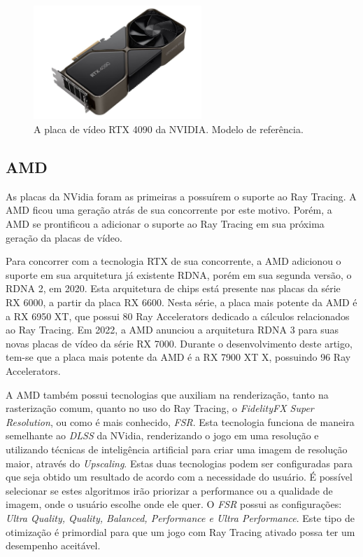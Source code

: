 \documentclass[journal]{IEEEtran}
\begin{document}
\begin{figure}[ht]
  \centering
  \includegraphics[width=2.5in]{media/rtx4090.jpg}
  \caption{A placa de vídeo RTX 4090 da NVIDIA. Modelo de referência.}
  \label{img_rtx4090}
\end{figure}


\subsection{AMD}
As placas da NVidia foram as primeiras a possuírem o suporte ao Ray Tracing. A AMD
ficou uma geração atrás de sua concorrente por este motivo. Porém, a AMD se prontificou
a adicionar o suporte ao Ray Tracing em sua próxima geração da placas de vídeo.

Para concorrer com a tecnologia RTX de sua concorrente, a AMD adicionou o suporte em sua
arquitetura já existente RDNA, porém em sua segunda versão, o RDNA 2, em 2020. Esta arquitetura 
de chips está presente nas placas da série RX 6000, a partir da placa RX 6600. Nesta série,
a placa mais potente da AMD é a RX 6950 XT, que possui 80 Ray Accelerators dedicado a
cálculos relacionados ao Ray Tracing. Em 2022, a AMD anunciou a arquitetura RDNA 3 para
suas novas placas de vídeo da série RX 7000. Durante o desenvolvimento deste artigo,
tem-se que a placa mais potente da AMD é a RX 7900 XT X, possuindo 96 Ray Accelerators.

A AMD também possui tecnologias que auxiliam na renderização, tanto na rasterização comum,
quanto no uso do Ray Tracing, o \emph{FidelityFX Super Resolution}, ou como é mais conhecido,
\emph{FSR}. Esta tecnologia funciona de maneira semelhante ao \emph{DLSS} da NVidia, renderizando
o jogo em uma resolução e utilizando técnicas de inteligência artificial para criar uma imagem
de resolução maior, através do \emph{Upscaling}. Estas duas tecnologias podem ser configuradas
para que seja obtido um
resultado de acordo com a necessidade do usuário. É possível selecionar se estes algoritmos
irão priorizar a performance ou a qualidade de imagem, onde o usuário escolhe onde ele quer.
O \emph{FSR} possui as configurações: \emph{Ultra Quality, Quality, Balanced, Performance e
Ultra Performance}. Este tipo de otimização é primordial para que um jogo com Ray Tracing
ativado possa ter um desempenho aceitável.
\end{document}
